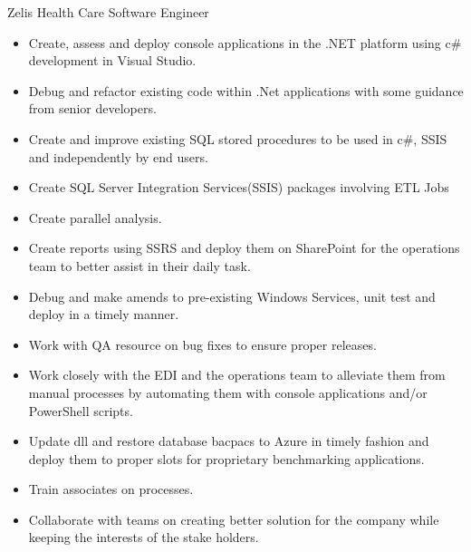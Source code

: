 \documentclass[letterpaper]{twentysecondcv} %
\begin{document}
{} %
{Zelis Health Care} %
{Software Engineer} %
{} %
\begin{itemize}
		\setlength \itemsep{0em}	
		\item Create, assess and deploy console applications in the .NET platform using c\# development in Visual Studio.
		\item Debug and refactor existing code within .Net applications with some guidance from senior developers.
		\item Create and improve existing SQL stored procedures to be used in c\#, SSIS and independently by end users. 
		\item Create SQL Server Integration Services(SSIS) packages involving ETL Jobs
		\item Create parallel analysis.
		\item Create reports using SSRS and deploy them on SharePoint for the operations team to better assist in their daily task.
		\item Debug and make amends to pre-existing Windows Services, unit test and deploy in a timely manner.
		\item Work with QA resource on bug fixes to ensure proper releases.
		\item Work closely with the EDI and the operations team to alleviate them from manual processes by automating them with console applications and/or PowerShell scripts.
		\item Update dll and restore database bacpacs to Azure in timely fashion and deploy them to proper slots for proprietary benchmarking applications.
		\item Train associates on processes.
		\item Collaborate with teams on creating better solution for the company while keeping the interests of the stake holders.
	\end{itemize}
\end{document}

